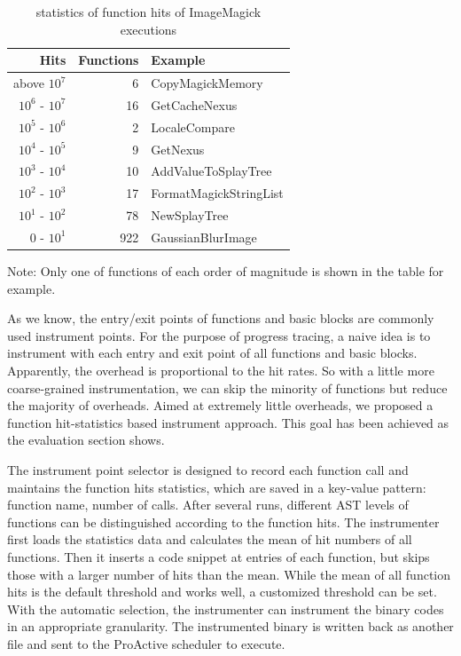 \begin{table}[h]
\caption{statistics of function hits of ImageMagick executions}
\label{table:inst-stats}
\begin{center}
\begin{tabular}{r|r|l}
\hline
Hits & Functions & Example \\
\hline
above $10^7$ & 6 & CopyMagickMemory \\
$10^6$ - $10^7$ & 16 & GetCacheNexus \\
$10^5$ - $10^6$ & 2 & LocaleCompare \\
$10^4$ - $10^5$ & 9 & GetNexus \\
$10^3$ - $10^4$ & 10 & AddValueToSplayTree \\
$10^2$ - $10^3$ & 17 & FormatMagickStringList \\
$10^1$ - $10^2$ & 78 & NewSplayTree \\
$0$    - $10^1$ & 922 & GaussianBlurImage \\
\hline
\end{tabular}
\end{center}
Note: Only one of functions of each order of magnitude is shown in the table for example.
\end{table}

As we know, the entry/exit points of functions and basic blocks are commonly used instrument points. For the purpose of progress tracing, a naive idea is to instrument with each entry and exit point of all functions and basic blocks. Apparently, the overhead is proportional to the hit rates. So with a little more coarse-grained instrumentation, we can skip the minority of functions but reduce the majority of overheads. Aimed at extremely little overheads, we proposed a function hit-statistics based instrument approach. This goal has been achieved as the evaluation section shows.

The instrument point selector is designed to record each function call and maintains the function hits statistics, which are saved in a key-value pattern: function name, number of calls. After several runs, different AST levels of functions can be distinguished according to the function hits. The instrumenter first loads the statistics data and calculates the mean of hit numbers of all functions. Then it inserts a code snippet at entries of each function, but skips those with a larger number of hits than the mean. While the mean of all function hits is the default threshold and works well, a customized threshold can be set. With the automatic selection, the instrumenter can instrument the binary codes in an appropriate granularity. The instrumented binary is written back as another file and sent to the ProActive scheduler to execute.

